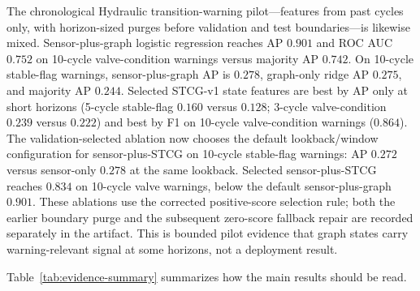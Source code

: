 \documentclass[sigconf,anonymous]{acmart}
\begin{document}
The chronological Hydraulic transition-warning pilot---features from past cycles only, with horizon-sized purges before validation and test boundaries---is likewise mixed.
Sensor-plus-graph logistic regression reaches AP $0.901$ and ROC AUC $0.752$ on 10-cycle valve-condition warnings versus majority AP $0.742$. On 10-cycle stable-flag warnings, sensor-plus-graph AP is $0.278$, graph-only ridge AP $0.275$, and majority AP $0.244$.
Selected STCG-v1 state features are best by AP only at short horizons (5-cycle stable-flag $0.160$ versus $0.128$; 3-cycle valve-condition $0.239$ versus $0.222$) and best by F1 on 10-cycle valve-condition warnings ($0.864$). The validation-selected ablation now chooses the default lookback/window configuration for sensor-plus-STCG on 10-cycle stable-flag warnings: AP $0.272$ versus sensor-only $0.278$ at the same lookback. Selected sensor-plus-STCG reaches $0.834$ on 10-cycle valve warnings, below the default sensor-plus-graph $0.901$. These ablations use the corrected positive-score selection rule; both the earlier boundary purge and the subsequent zero-score fallback repair are recorded separately in the artifact.
This is bounded pilot evidence that graph states carry warning-relevant signal at some horizons, not a deployment result.

\begin{table}[t]
\caption{Real benchmark one-step forecasting RMSE on ETT small, BeijingPM25, OccupancySensors, AReMActivities, UCIHARWindowSignals, and HydraulicSystems datasets, reported as a leakage-controlled diagnostic. Mask columns use hard graph feature selection; weight columns use graph-weighted ridge. Lower is better.}
\label{tab:real-forecasting}
\centering
\small
\resizebox{\linewidth}{!}{}
\end{table}

Table~\ref{tab:evidence-summary} summarizes how the main results should be read.
\begin{table}[t]
\caption{Evidence summary across synthetic and real probes.}
\label{tab:evidence-summary}
\centering
\small
\resizebox{\linewidth}{!}{}
\end{table}
\end{document}
